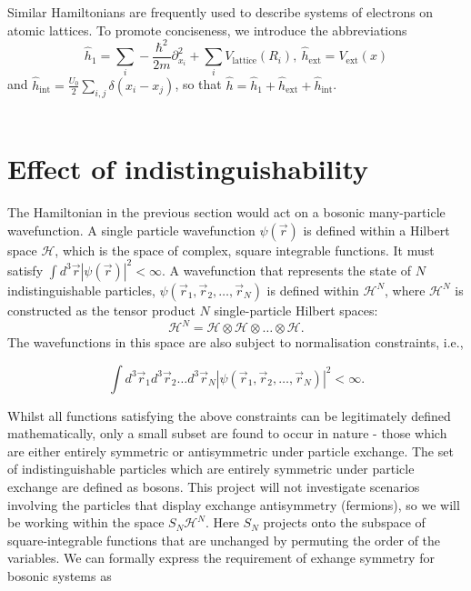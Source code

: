 \documentclass[a4paper,10pt]{article}
\begin{document}
Similar Hamiltonians are frequently used to describe systems of electrons on atomic lattices. To promote conciseness, we introduce the abbreviations 
\begin{equation}
 \hat{h}_1=\sum_{i}-\frac{\hbar^{2}}{2m}  \partial_{x_{i}}^2+\sum_{i}V_{\text{lattice}}(R_{i}), \ \hat{h}_{\text{ext}} =V_{\text{ext}}(x) 
\end{equation}
and $\hat{h}_{\text{int}}=\frac{U_0}{2}\sum_{i,j}\delta(x_{i}-x_{j})$, so that $\hat{h}=\hat{h}_1+\hat{h}_{\text{ext}}+\hat{h}_{\text{int}}$.
\\\\



\section{Effect of indistinguishability}
The Hamiltonian in the previous section would act on a bosonic many-particle wavefunction. A single particle wavefunction $\psi(\vec{r})$ is 
defined within a Hilbert space $\mathcal{H}$, which is the space of complex, square integrable functions. It must satisfy $\int d^3\vec{r}|\psi(\vec{r})|^2<\infty$.
A wavefunction that represents the state of $N$ indistinguishable particles, $\psi(\vec{r}_{1},\vec{r}_{2},\dots,\vec{r}_{N})$ is defined within $\mathcal{H}^N$, where
$\mathcal{H}^N$ is constructed as the tensor product $N$ single-particle Hilbert spaces:
\begin{equation}
 \mathcal{H}^N=\mathcal{H}\otimes \mathcal{H} \otimes \dots\otimes \mathcal{H}.
\end{equation}
The wavefunctions in this space are also subject to normalisation constraints, i.e.,

\begin{equation*}
 \int d^3\vec{r}_1 d^3\vec{r}_2\dots d^3\vec{r}_N |\psi(\vec{r}_{1},\vec{r}_{2},\dots,\vec{r}_{N})|^2<\infty.
\end{equation*}

Whilst all functions satisfying the above constraints can be legitimately defined mathematically, only a small subset are found to occur in nature - those which are either 
entirely symmetric or antisymmetric under particle exchange. The set of indistinguishable particles which are entirely symmetric under particle exchange are defined as bosons.
This project will not investigate scenarios involving the particles that display exchange antisymmetry (fermions), so we will be working within the space $S_N\mathcal{H}^N$. Here
$S_N$ projects onto the subspace of square-integrable functions that are unchanged by permuting the order of the variables. We can formally
express the requirement of exhange symmetry for bosonic systems as \cite{Negele1988}
\end{document}
